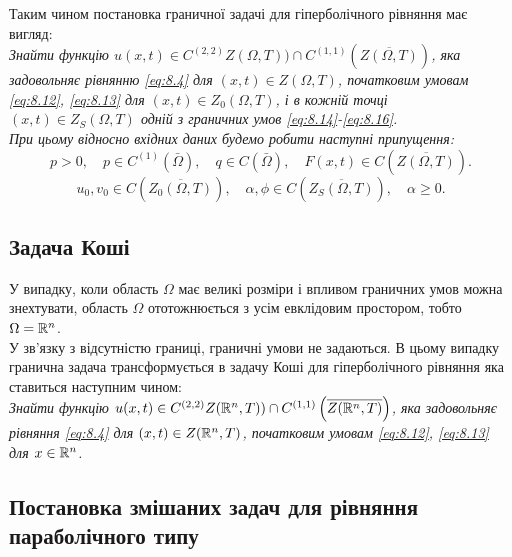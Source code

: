 Таким чином постановка граничної задачі для гіперболічного рівняння має
вигляд: \\

\textit{
	Знайти функцію $u(x, t) \in C^{(2, 2)}{Z(\Omega, T))} \cap C^{(1, 1)} \left( \overline{Z(\Omega, T)} \right)$, яка задовольняє рівнянню \eqref{eq:8.4} для $(x, t) \in Z(\Omega, T)$, початковим умовам \eqref{eq:8.12}, \eqref{eq:8.13} для $(x, t) \in Z_0(\Omega, T)$, і в кожній точці $(x, t) \in Z_S(\Omega, T)$ одній з граничних умов \eqref{eq:8.14}-\eqref{eq:8.16}.
} \\

\textit{
	При цьому відносно вхідних даних будемо робити наступні припущення:
}
\begin{equation}
	\label{eq:8.17}
	p > 0, \quad p \in C^{(1)}(\bar \Omega), \quad q \in C(\bar \Omega), \quad F(x, t) \in C \left( \overline{Z(\Omega, T)} \right).
\end{equation}
\begin{equation}
	\label{eq:8.18}
	u_0, v_0 \in C \left( \overline{Z_0(\Omega, T)} \right), \quad \alpha, \phi \in C \left( \overline{Z_S(\Omega, T)} \right), \quad \alpha \ge 0.
\end{equation}

\subsection{Задача Коші}

У випадку, коли область $\Omega$ має великі розміри і впливом граничних умов можна знехтувати, область $\Omega$ ототожнюється з усім евклідовим простором, тобто $\Omega = \mathbb{R}^n$. \\

У зв'язку з відсутністю границі, граничні умови не задаються. В цьому випадку гранична задача трансформується в задачу Коші для гіперболічного рівняння яка ставиться наступним чином: \\

\textit{
	Знайти функцію $u(x, t) \in C^{(2, 2)}{Z(\mathbb{R}^n, T))} \cap C^{(1, 1)} \left( \overline{Z(\mathbb{R}^n, T)} \right)$, яка задовольняє рівняння \eqref{eq:8.4} для $(x, t) \in Z(\mathbb{R}^n, T)$, початковим умовам \eqref{eq:8.12}, \eqref{eq:8.13} для $x \in \mathbb{R}^n$.
}

\subsection{Постановка змішаних задач для рівняння параболічного типу}

